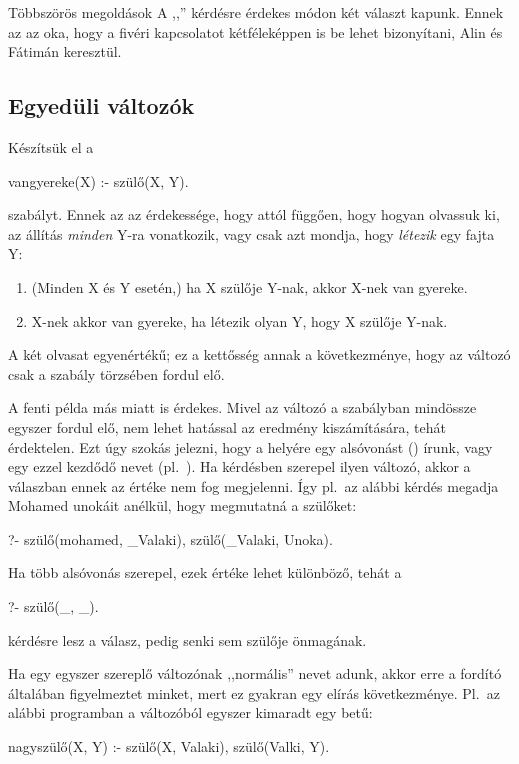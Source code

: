 \begin{infobox*}{}{Többszörös megoldások}
A ,,'' kérdésre
érdekes módon két  választ kapunk.
Ennek az az oka, hogy a fivéri kapcsolatot
kétféleképpen is be lehet bizonyítani, Alin és
Fátimán keresztül.
\end{infobox*}

\subsection*{Egyedüli változók}

Készítsük el a
\begin{program}
vangyereke(X) :- szülő(X, Y).
\end{program}
szabályt.  Ennek az az érdekessége, hogy attól
függően, hogy hogyan olvassuk ki, az állítás
\emph{minden} Y-ra vonatkozik, vagy csak azt
mondja, hogy \emph{létezik} egy fajta Y:

\begin{enumerate}
\item (Minden X és Y esetén,) ha X szülője Y-nak,
  akkor X-nek van gyereke.
\item X-nek akkor van gyereke, ha létezik olyan Y,
  hogy X szülője Y-nak.
\end{enumerate}
A két olvasat egyenértékű; ez a kettősség annak a
következménye, hogy az  változó csak a szabály
törzsében fordul elő.

A fenti példa más miatt is érdekes. Mivel az 
változó a szabályban mindössze egyszer fordul elő,
nem lehet hatással az eredmény kiszámítására, tehát
érdektelen. Ezt úgy szokás jelezni, hogy a helyére
egy alsóvonást (\pr{\_}) írunk, vagy egy ezzel
kezdődő nevet (pl.~).\index{\pr{\_}} Ha
kérdésben szerepel ilyen változó, akkor a válaszban
ennek az értéke nem fog megjelenni. Így pl.~az
alábbi kérdés megadja Mohamed unokáit anélkül, hogy
megmutatná a szülőket:
\begin{query}
?- szülő(mohamed, _Valaki), szülő(_Valaki, Unoka).
\end{query}

Ha több alsóvonás szerepel, ezek értéke lehet
különböző, tehát a
\begin{query}
?- szülő(_, _).
\end{query}
kérdésre  lesz a válasz, pedig senki sem
szülője önmagának.

Ha egy egyszer szereplő változónak ,,normális''
nevet adunk, akkor erre a fordító általában
figyelmeztet minket, mert ez gyakran egy elírás
következménye. Pl.~az alábbi programban a
 változóból egyszer kimaradt egy 
betű:
\begin{program}
nagyszülő(X, Y) :-
    szülő(X, Valaki), szülő(Valki, Y).
\end{program}

